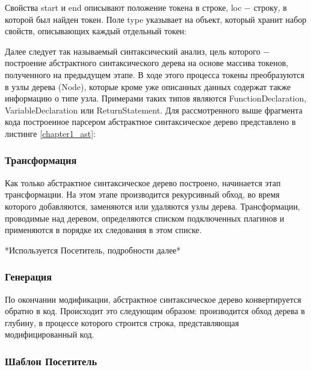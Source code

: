 \documentclass[14pt, a4paper]{article}
\begin{document}


Свойства start и end описывают положение токена в строке, loc $-$ строку, в которой был найден токен. 
Поле type указывает на объект, который хранит набор свойств, описывающих каждый отдельный токен:


Далее следует так называемый синтаксический анализ, цель которого $-$ построение абстрактного 
синтаксического дерева на основе массива токенов, полученного на предыдущем этапе. В ходе этого 
процесса токены преобразуются в узлы дерева (Node), которые кроме уже описанных данных содержат также
информацию о типе узла. Примерами таких типов являются FunctionDeclaration, VariableDeclaration или 
ReturnStatement. Для рассмотренного выше фрагмента кода построенное парсером абстрактное синтаксическое 
дерево представлено в листинге \ref{chapter1_ast}:



\subsubsection*{Трансформация}
Как только абстрактное синтаксическое дерево построено, начинается этап трансформации. На этом этапе 
производится рекурсивный обход, во время которого добавляются, заменяются или удаляются узлы дерева.
Трансформации, проводимые над деревом, определяются списком подключенных плагинов и применяются в 
порядке их следования в этом списке.

*Используется Посетитель, подробности далее* 

\subsubsection*{Генерация}
По окончании модификации, абстрактное синтаксическое дерево конвертируется обратно в код. 
Происходит это следующим образом: производится обход дерева в глубину, в процессе которого строится строка,
представляющая модифицированный код.

\subsubsection{Шаблон Посетитель}
\end{document}
